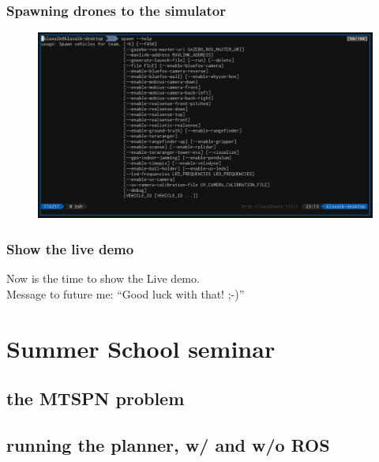 \documentclass[aspectratio=1610]{beamer}
\begin{document}
\begin{frame}
  \frametitle{Spawning drones to the simulator}

  \begin{figure}
    \includegraphics[width=1.0\textwidth]{./fig/spawn.png}
  \end{figure}

\end{frame}

\begin{frame}
  \frametitle{Show the live demo}

  \begin{center}
    \large Now is the time to show the Live demo.\\
    \vspace{2em}
    Message to future me: ``Good luck with that! ;-)''
  \end{center}

\end{frame}


\section{Summer School seminar}
\subsection{the MTSPN problem}
\subsection{running the planner, w/ and w/o ROS}

\end{document}
